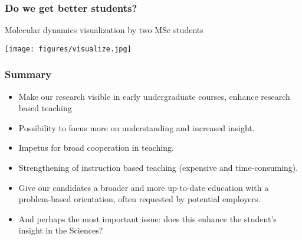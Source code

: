 \documentclass{beamer}
\begin{document}
\begin{frame}
\frametitle{Do we get better students?}

\begin{block}{Molecular dynamics visualization by two MSc students }


\centerline{\texttt{[image: figures/visualize.jpg]}}




\end{block}
\end{frame}

\begin{frame}
\frametitle{Summary}

\begin{block}{}

\begin{itemize}
\item Make our research visible in early undergraduate courses, enhance research based teaching

\item Possibility to focus more on understanding and increased insight.

\item Impetus for broad cooperation in teaching.

\item Strengthening of instruction based teaching (expensive and time-consuming).

\item Give our candidates a broader and more up-to-date education with a problem-based orientation, often requested by potential employers.

\item And perhaps the most important issue: does this enhance the student's insight in the Sciences?
\end{itemize}

\noindent
\end{block}
\end{frame}
\end{document}
